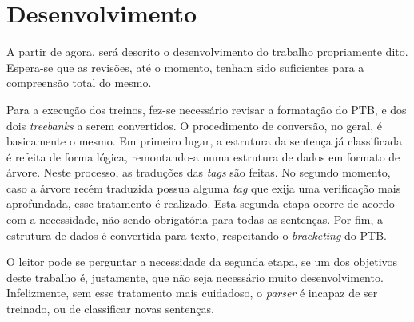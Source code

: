 \chapter{Desenvolvimento}
\label{cap:desenv}

A partir de agora, será descrito o desenvolvimento do trabalho propriamente dito. Espera-se que as revisões, até o momento, tenham sido suficientes para a compreensão total do mesmo.

Para a execução dos treinos, fez-se necessário revisar a formatação do PTB, e dos dois \textit{treebanks} a serem convertidos. O procedimento de conversão, no geral, é basicamente o mesmo. Em primeiro lugar, a estrutura da sentença já classificada é refeita de forma lógica, remontando-a numa estrutura de dados em formato de árvore. Neste processo, as traduções das \textit{tags} são feitas. No segundo momento, caso a árvore recém traduzida possua alguma \textit{tag} que exija uma verificação mais aprofundada, esse tratamento é realizado. Esta segunda etapa ocorre de acordo com a necessidade, não sendo obrigatória para todas as sentenças. Por fim, a estrutura de dados é convertida para texto, respeitando o \textit{bracketing} do PTB.

O leitor pode se perguntar a necessidade da segunda etapa, se um dos objetivos deste trabalho é, justamente, que não seja necessário muito desenvolvimento. Infelizmente, sem esse tratamento mais cuidadoso, o \textit{parser} é incapaz de ser treinado, ou de classificar novas sentenças. 






